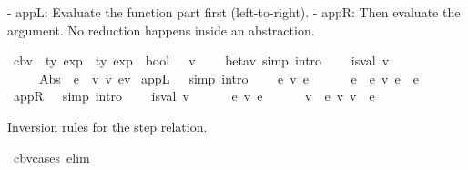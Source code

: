 \begin{isabellebody}
\begin{isamarkuptext}
  - appL: Evaluate the function part first (left-to-right).
  - appR: Then evaluate the argument.
  No reduction happens inside an abstraction.%
\end{isamarkuptext}\isamarkuptrue%
\isamarkupfalse%
\ cbv\ {\isacharcolon}{\kern0pt}{\isacharcolon}{\kern0pt}\ {\isachardoublequoteopen}{\isacharprime}{\kern0pt}ty\ exp\ {\isasymRightarrow}\ {\isacharprime}{\kern0pt}ty\ exp\ {\isasymRightarrow}\ bool{\isachardoublequoteclose}\ \ {\isacharparenleft}{\kern0pt}\ {\isachardoublequoteopen}{\isasymrightarrow}\isactrlsub v{\isachardoublequoteclose}\ {}{}{\isacharparenright}{\kern0pt}\ \isanewline
\ \ beta{\isacharunderscore}{\kern0pt}v\ {\isacharbrackleft}{\kern0pt}simp{\isacharcomma}{\kern0pt}\ intro{\isacharbrackright}{\kern0pt}{\isacharcolon}{\kern0pt}\isanewline
\ \ \ \ {\isachardoublequoteopen}is{\isacharunderscore}{\kern0pt}val\ v\ {\isasymLongrightarrow}\isanewline
\ \ \ \ \ Abs\ {\isasymtau}\ e\ {\isasymcdot}\ v\ {\isasymrightarrow}\isactrlsub v\ e{\isacharbrackleft}{\kern0pt}v{\isacharslash}{\kern0pt}{}{\isacharbrackright}{\kern0pt}{\isachardoublequoteclose}\isanewline
{\isacharbar}{\kern0pt}\ appL\ \ \ {\isacharbrackleft}{\kern0pt}simp{\isacharcomma}{\kern0pt}\ intro{\isacharbrackright}{\kern0pt}{\isacharcolon}{\kern0pt}\isanewline
\ \ \ \ {\isachardoublequoteopen}e{}\ {\isasymrightarrow}\isactrlsub v\ e{}{\isacharprime}{\kern0pt}\ {\isasymLongrightarrow}\isanewline
\ \ \ \ \ e{}\ {\isasymcdot}\ e{}\ {\isasymrightarrow}\isactrlsub v\ e{}{\isacharprime}{\kern0pt}\ {\isasymcdot}\ e{}{\isachardoublequoteclose}\isanewline
{\isacharbar}{\kern0pt}\ appR\ \ \ {\isacharbrackleft}{\kern0pt}simp{\isacharcomma}{\kern0pt}\ intro{\isacharbrackright}{\kern0pt}{\isacharcolon}{\kern0pt}\isanewline
\ \ \ \ {\isachardoublequoteopen}is{\isacharunderscore}{\kern0pt}val\ v\ {\isasymLongrightarrow}\isanewline
\ \ \ \ \ e\ {\isasymrightarrow}\isactrlsub v\ e{\isacharprime}{\kern0pt}\ {\isasymLongrightarrow}\isanewline
\ \ \ \ \ v\ {\isasymcdot}\ e\ {\isasymrightarrow}\isactrlsub v\ v\ {\isasymcdot}\ e{\isacharprime}{\kern0pt}{\isachardoublequoteclose}%
\begin{isamarkuptext}%
Inversion rules for the step relation.%
\end{isamarkuptext}\isamarkuptrue%
\isamarkupfalse%
\ cbv{\isacharunderscore}{\kern0pt}cases\ {\isacharbrackleft}{\kern0pt}elim{\isacharbang}{\kern0pt}{\isacharbrackright}{\kern0pt}{\isacharcolon}{\kern0pt}\isanewline

\end{isabellebody}
